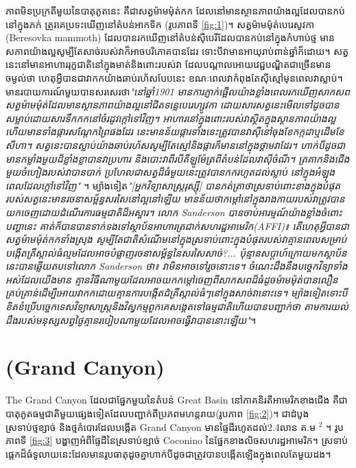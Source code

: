 \documentclass[10pt,twocolumn,letterpaper]{article}
\begin{document}
ភាពមិនប្រក្រតីមួយនៃបាតុភូតនេះ គឺជាសត្វម៉ាមម៉ុត់កក ដែលនៅមានស្ថានភាពយ៉ាងល្អដែលបានកប់នៅក្នុងភក់ ត្រូវគេប្រទះឃើញនៅតំបន់អាកទិក (រូបភាពទី \ref{fig:1})។ សត្វម៉ាមម៉ុត់បេរេសូវកា (Beresovka mammoth) ដែលបានរកឃើញនៅតំបន់ស៊ីបេរីដែលបានកប់នៅក្នុងកំហាប់ថ្ម មានសភាពយ៉ាងល្អសូម្បីតែសាច់របស់វាក៏អាចបរិភោគបានដែរ ទោះបីវាមានអាយុរាប់ពាន់ឆ្នាំក៏ដោយ។ សត្វនេះនៅមានអាហាររុក្ខជាតិនៅក្នុងមាត់និងពោះរបស់វា ដែលបណ្ដាលអោយវេជ្ជបណ្ឌិតជាច្រើនមានចម្ងល់ថា ហេតុអ្វីបានជាវាកកយ៉ាងឆាប់រហ័សបែបនេះ ខណៈពេលវាកំពុងតែសុីស្មៅមុនពេលវាស្លាប់\cite{17}។ មានរបាយការណ៍មួយបានសរសេរថា\textit{"នៅឆ្នាំ1901 មានការភ្ញាក់ផ្អើលយ៉ាងខ្លាំងពេលរកឃើញសាកសពសត្វម៉ាមម៉ុត់ដែលមានស្ថានភាពយ៉ាងល្អនៅជិតទន្លេបេរេហ្សូវកា ដោយសារសត្វនេះមើលទៅដូចបានសម្លាប់ដោយសារទឹកកកនៅចំរដូវក្តៅទៅវិញ។ អាហារនៅក្នុងពោះរបស់វាស្ថិតក្នុងស្ថានភាពយ៉ាងល្អ ហើយមានទាំងផ្ការសណ្តែកព្រៃផងដែរ នេះមានន័យផ្ការទាំងនេះត្រូវបានវាសុីនៅចុងខែកក្កដាឬដើមខែសីហា។ សត្វនេះបានស្លាប់យ៉ាងឆាប់រហ័សសូម្បីតែស្មៅនិងផ្ការក៏មាននៅក្នុងថ្គាមវាដែរ។ ហាក់បីដូចជាមានកម្លាំងមួយដ៏ខ្លាំងខ្លាបានវាប្រហារ និងបោះវាពីរបីគីឡូម៉ែត្រពីតំបន់ដែលវាសុីចំណី។ ត្រគាកនិងជើងមួយចំហៀងរបស់វាបានបាក់ ប្រហែលជាសត្វដ៏ធំមួយនេះត្រូវបានកករហូតដល់ស្លាប់ នៅក្នុងអំឡុងពេលដែលក្តៅទៅវិញ"} \cite{18}។ ម្យ៉ាងទៀត\textit{"[អ្នកវិទ្យាសាស្ត្ររុស្ស៊ី] បានកត់ត្រាថាស្រទាប់ពោះខាងក្នុងបំផុតរបស់សត្វនេះមានរចនាសម្ព័ន្ធសរសៃនៅល្អនៅឡើយ មានន័យថាកម្តៅនៅក្នុងរាងកាយរបស់វាត្រូវបានយកចេញដោយដំណើរការធម្មជាតិដ៏អស្ចារ។ លោក Sanderson បានចាប់អារម្មណ៍យ៉ាងខ្លាំងចំពោះបញ្ហានេះ គាត់ក៏បានបានទាក់ទងទៅស្ថាប័នអាហារត្រជាក់សហរដ្ឋអាមេរិក(AFFI)៖ តើហេតុអ្វីបានជាសត្វម៉ាមម៉ុត់កកទាំងស្រុង សូម្បីតែជាតិសំណើមនៅក្នុងស្រទាប់ពោះក្នុងបំផុតរបស់វាគ្មានពេលសម្រាប់បង្កើតគ្រីស្តាល់ធំល្មមដែលអាចបំផ្លាញរចនាសម្ព័ន្ធនៃសរសៃសាច់?... ប៉ុន្មានសប្តាហ៍ក្រោយមកស្ថាប័ននេះបានឆ្លើយតបទៅលោក Sanderson ថា៖ វាមិនអាចទៅរួចនោះទេ។ ចំណេះដឹងនឹងបច្ចេកវិទ្យាទាំងអស់ដែលយើងមាន គ្មានវិធីណាមួយដែលអាចយកកម្ដៅចេញពីសាកសពដ៏ធំដូចម៉ាមម៉ុត់បានលឿនគ្រប់គ្រាន់ដើម្បីអោយវាកកដោយគ្មានការបង្កើតដំគ្រីស្តាល់ធំៗនៅក្នុងសាច់វានោះទេ។ ម្យ៉ាងទៀតទោះបីខិតខំប្រើបច្ចេកទេសវិទ្យាសាស្រ្តនិងវិស្វកម្មពួកគេសង្គេតទៅធម្មជាតិហើយបានបញ្ជាក់ថា តាមការយល់ដឹងរបស់មនុស្សសព្វថ្ងៃគ្មានរបៀបណាមួយដែលអាចធ្វើវាបាននោះឡើយ"}\cite{19}។

\section{ (Grand Canyon)}

The Grand Canyon ដែលជាផ្នែកមួយនៃតំបន់ Great Basin នៅភាគនិរតីអាមេរិកខាងជើង គឺជាបាតុភូតធម្មជាតិមួយផ្សេងទៀតដែលបញ្ជាក់ពីប្រភពមហន្តរាយ(រូបភាព \ref{fig:2})។ ជាដំបូង ស្រទាប់ថ្មខ្សាច់ និងថ្មកំបោរដែលបង្កើត Grand Canyon មានផ្ទៃដីរហូតដល់2.4លាន គ.ម $^2$ \cite{21}។ រូបភាពទី \ref{fig:3} បង្ហាញអំពីផ្ទៃដីនៃស្រទាប់ខ្សាច់ Coconino នៃផ្នែកខាងលិចសហរដ្ឋអាមេរិក។ ស្រទាប់ផ្តេកដ៏ធំទូលាយនេះដែលមានរូបធាតុដូចគ្នាហាក់បីដូចជាត្រូវបានបង្កើតឡើងក្នុងពេលតែមួយដង។
\end{document}
